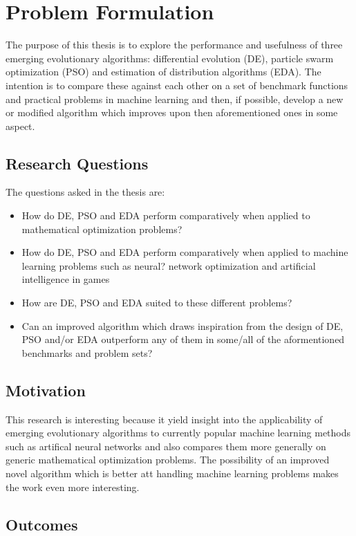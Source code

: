 \section{Problem Formulation}

The purpose of this thesis is to explore the performance and usefulness of three emerging evolutionary algorithms: differential evolution (DE), particle swarm optimization (PSO) and estimation of distribution algorithms (EDA). The intention is to compare these against each other on a set of benchmark functions and practical problems in machine learning and then, if possible, develop a new or modified algorithm which improves upon then aforementioned ones in some aspect.

\subsection{Research Questions}

The questions asked in the thesis are:
\begin{itemize}
  \item How do DE, PSO and EDA perform comparatively when applied to mathematical optimization problems?
  \item How do DE, PSO and EDA perform comparatively when applied to machine learning problems such as neural? network optimization and artificial intelligence in games
  \item How are DE, PSO and EDA suited to these different problems?
  \item Can an improved algorithm which draws inspiration from the design of DE, PSO and/or EDA outperform any of them in some/all of the aformentioned benchmarks and problem sets?
\end{itemize}

\subsection{Motivation}

This research is interesting because it yield insight into the applicability of emerging evolutionary algorithms to currently popular machine learning methods such as artifical neural networks and also compares them more generally on generic mathematical optimization problems. The possibility of an improved novel algorithm which is better att handling machine learning problems makes the work even more interesting.

\subsection{Outcomes}

